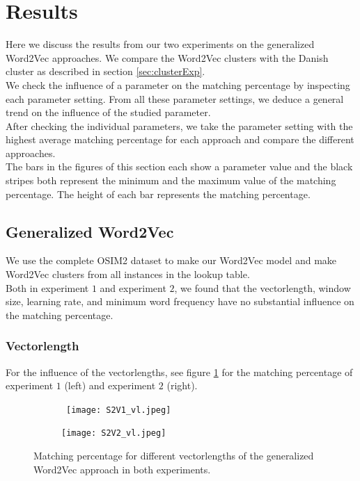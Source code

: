 \section{Results}
\label{sec:expResults}

Here we discuss the results from our two experiments on the generalized Word2Vec approaches. We compare the Word2Vec clusters with the Danish cluster as described in section \ref{sec:clusterExp}. \\
We check the influence of a parameter on the matching percentage by inspecting each parameter setting. From all these parameter settings, we deduce a general trend on the influence of the studied parameter. \\
After checking the individual parameters, we take the parameter setting with the highest average matching percentage for each approach and compare the different approaches. \\

The bars in the figures of this section each show a parameter value and the black stripes both represent the minimum and the maximum value of the matching percentage. The height of each bar represents the matching percentage.

\subsection{Generalized Word2Vec}
\label{sec:genWordExp}

We use the complete OSIM2 dataset to make our Word2Vec model and make Word2Vec clusters from all instances in the lookup table. \\
Both in experiment $1$ and experiment $2$, we found that the vectorlength, window size, learning rate, and minimum word frequency have no substantial influence on the matching percentage. 

\subsubsection{Vectorlength}

For the influence of the vectorlengths, see figure \ref{fig:s2v_vl} for the matching percentage of experiment $1$ (left) and experiment $2$ (right). \\

\begin{figure}[!htb]
	\centering
	\begin{subfigure}[b]{.49\textwidth}\
		\texttt{[image: S2V1\_vl.jpeg]}
	\end{subfigure}
	\begin{subfigure}[b]{.49\textwidth}
		\texttt{[image: S2V2\_vl.jpeg]}
	\end{subfigure}
	\caption{Matching percentage for different vectorlengths of the generalized Word2Vec 		approach in both experiments.}
	\label{fig:s2v_vl}
\end{figure}

